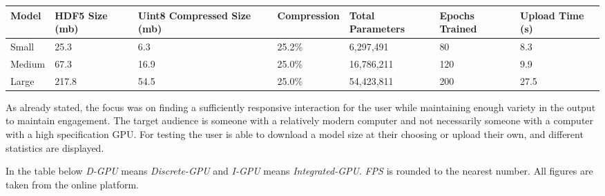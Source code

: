 \documentclass{article}
\begin{document}
\begin{small}
	\begin{center}
		\begin{tabularx}{\textwidth}{bbbbbbb}
			\toprule
			Model  & HDF5 Size (mb) & Uint8 Compressed Size (mb) & Compression & Total Parameters & Epochs Trained & Upload Time (s) \\
			\midrule
			Small  & 25.3           & 6.3                        & 25.2\%      & 6,297,491        & 80             & 8.3             \\
			Medium & 67.3           & 16.9                       & 25.0\%      & 16,786,211       & 120            & 9.9             \\
			Large  & 217.8          & 54.5                       & 25.0\%      & 54,423,811       & 200            & 27.5            \\
			\bottomrule
		\end{tabularx}
		\label{table:model_details}
	\end{center}
\end{small}



As already stated, the focus was on finding a sufficiently responsive interaction for the user while maintaining enough variety in the output to maintain engagement. The target audience is someone with a relatively modern computer and not necessarily someone with a computer with a high specification GPU. For testing the user is able to download a model size at their choosing or upload their own, and different statistics are displayed.

In the table below \textit{D-GPU} means \textit{Discrete-GPU} and \textit{I-GPU} means \textit{Integrated-GPU}. \textit{FPS} is rounded to the nearest number. All figures are taken from the online platform.
\end{document}
